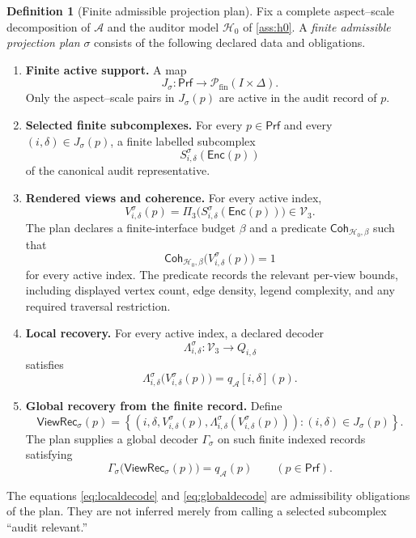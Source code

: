 \documentclass[11pt]{article}
\newcommand{\Prf}{\mathsf{Prf}}
\newcommand{\Enc}{\mathsf{Enc}}
\newcommand{\qA}{q_{\mathcal A}}
\newcommand{\mcA}{\mathcal A}
\newcommand{\mcH}{\mathcal H_0}
\newcommand{\mcV}{\mathcal V_3}
\newcommand{\Fin}{\ensuremath{\mathcal P_{\mathrm{fin}}}}
\newcommand{\ViewRec}{\ensuremath{\mathsf{ViewRec}}}
\newcommand{\Coh}{\ensuremath{\mathsf{Coh}}}
\theoremstyle{plain}
\theoremstyle{definition}
\newtheorem{definition}[theorem]{Definition}
\theoremstyle{remark}
\begin{document}
\begin{definition}[Finite admissible projection plan]
\label{def:selection}
Fix a complete aspect--scale decomposition of $\mcA$ and the auditor model
$\mcH$ of \cref{ass:h0}.  A \emph{finite admissible projection plan} $\sigma$
consists of the following declared data and obligations.

\begin{enumerate}[label=\textnormal{(P\arabic*)},leftmargin=2.8em]
\item \textbf{Finite active support.} A map
\[
  J_\sigma:\Prf\longrightarrow\Fin(I\times\Delta).
\]
Only the aspect--scale pairs in $J_\sigma(p)$ are active in the audit record of
$p$.

\item \textbf{Selected finite subcomplexes.} For every $p\in\Prf$ and every
$(i,\delta)\in J_\sigma(p)$, a finite labelled subcomplex
\[
  S^\sigma_{i,\delta}(\Enc(p))
\]
of the canonical audit representative.

\item \textbf{Rendered views and coherence.} For every active index,
\[
  V^\sigma_{i,\delta}(p)
  =
  \Pi_3\bigl(S^\sigma_{i,\delta}(\Enc(p))\bigr)\in\mcV.
\]
The plan declares a finite-interface budget $\beta$ and a predicate
$\Coh_{\mcH,\beta}$ such that
\[
  \Coh_{\mcH,\beta}\bigl(V^\sigma_{i,\delta}(p)\bigr)=1
\]
for every active index.  The predicate records the relevant per-view bounds,
including displayed vertex count, edge density, legend complexity, and any
required traversal restriction.

\item \textbf{Local recovery.} For every active index, a declared decoder
\[
  \Lambda^\sigma_{i,\delta}:\mcV\longrightarrow Q_{i,\delta}
\]
satisfies
\[
  \Lambda^\sigma_{i,\delta}\bigl(V^\sigma_{i,\delta}(p)\bigr)
  =
  \qA[i,\delta](p).
  \tag{P1}\label{eq:localdecode}
\]

\item \textbf{Global recovery from the finite record.} Define
\[
  \ViewRec_\sigma(p)
  =
  \left\{
  \left(
  i,\delta,
  V^\sigma_{i,\delta}(p),
  \Lambda^\sigma_{i,\delta}(V^\sigma_{i,\delta}(p))
  \right):
  (i,\delta)\in J_\sigma(p)
  \right\}.
\]
The plan supplies a global decoder $\Gamma_\sigma$ on such finite indexed
records satisfying
\[
  \Gamma_\sigma\bigl(\ViewRec_\sigma(p)\bigr)=\qA(p)
  \qquad(p\in\Prf).
  \tag{P2}\label{eq:globaldecode}
\]
\end{enumerate}

The equations \eqref{eq:localdecode} and \eqref{eq:globaldecode} are
admissibility obligations of the plan.  They are not inferred merely from
calling a selected subcomplex ``audit relevant.''
\end{definition}
\end{document}

